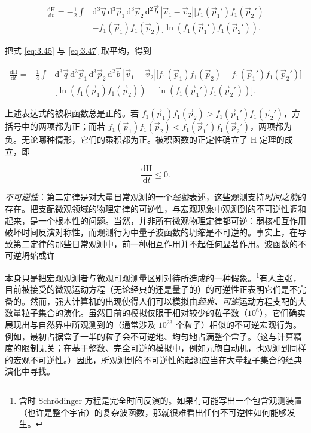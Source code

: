 \begin{equation}\label{eq:3.47}
  \begin{aligned}
    \frac{\mathrm{d}\mathrm{H}}{\mathrm{d}t}=-\frac{1}{2}\int &\mathrm{d}^3\vec q\,\mathrm{d}^3\vec p_1\,\mathrm{d}^3\vec p_2\,\mathrm{d}^2\vec b\,|\vec v_1-\vec v_2|\Big[f_1(\vec p_1{}')f_1(\vec p_2{}')\\
    &-f_1(\vec p_1)f_1(\vec p_2)\Big]\ln\left(f_1(\vec p_1{}')f_1(\vec p_2{}')\right).
  \end{aligned}
\end{equation}

把式 \eqref{eq:3.45} 与 \eqref{eq:3.47} 取平均，得到

\begin{equation}\label{eq:3.48}
  \begin{aligned}
    \frac{\mathrm{d}\mathrm{H}}{\mathrm{d}t}=-\frac{1}{4}\int &\mathrm{d}^3\vec q\,\mathrm{d}^3\vec p_1\,\mathrm{d}^3\vec p_2\,\mathrm{d}^2\vec b\,|\vec v_1-\vec v_2|\Big[f_1(\vec p_1)f_1(\vec p_2)-f_1(\vec p_1{}')f_1(\vec p_2{}')\Big]\\
    &\Big[\ln\left(f_1(\vec p_1)f_1(\vec p_2)\right)-\ln\left(f_1(\vec p_1{}')f_1(\vec p_2{}')\right)\Big].
  \end{aligned}
\end{equation}

上述表达式的被积函数总是正的。若 $f_1(\vec p_1)f_1(\vec p_2)>f_1(\vec p_1{}')f_1(\vec p_2{}')$，方括号中的两项都为正；而若 $f_1(\vec p_1)f_1(\vec p_2)<f_1(\vec p_1{}')f_1(\vec p_2{}')$，两项都为负。无论哪种情形，它们的乘积都为正。被积函数的正定性确立了 H 定理的成立，即

\begin{equation}\label{eq:3.49}
  \frac{\mathrm{d}\mathrm{H}}{\mathrm{d}t}\le 0.
\end{equation}

\emph{不可逆性}：第二定律是对大量日常观测的一个\emph{经验}表述，这些观测支持\emph{时间之箭}的存在。把支配微观领域的物理定律的可逆性，与宏观现象中观测到的不可逆性调和起来，是一个根本性的问题。当然，并非所有微观物理定律都可逆：弱核相互作用破坏时间反演对称性，而观测行为中量子波函数的坍缩是不可逆的。事实上，在导致第二定律的那些日常观测中，前一种相互作用并不起任何显著作用。波函数的不可逆坍缩或许

本身只是把宏观观测者与微观可观测量区别对待所造成的一种假象。\footnote{含时 Schrödinger 方程是完全时间反演的。如果有可能写出一个包含观测装置（也许是整个宇宙）的复杂波函数，那就很难看出任何不可逆性如何能够发生。}有人主张，目前被接受的微观运动方程（无论经典的还是量子的）的可逆性正表明它们是不完备的。然而，强大计算机的出现使得人们可以模拟由\emph{经典、可逆}运动方程支配的大数量粒子集合的演化。虽然目前的模拟仅限于相对较少的粒子数（$10^6$），它们确实展现出与自然界中所观测到的（通常涉及 $10^{23}$ 个粒子）相似的不可逆宏观行为。例如，最初占据盒子一半的粒子会不可逆地、均匀地占满整个盒子。（这与计算精度的限制无关；在基于整数、完全可逆的模拟中，例如元胞自动机，也观测到同样的宏观不可逆性。）因此，所观测到的不可逆性的起源应当在大量粒子集合的经典演化中寻找。

